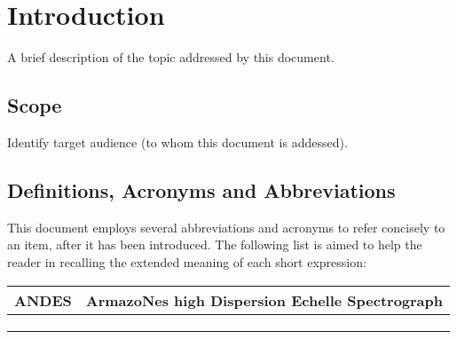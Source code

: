 \section{Introduction}
\label{sec:intro}

A brief description of the topic addressed by this document.


\subsection{Scope}
\label{sec:scope}

Identify target audience (to whom this document is addessed).


\subsection{Definitions, Acronyms and Abbreviations}
\label{sec:acronyms}

This document employs several abbreviations and acronyms to refer concisely to an item, after it has been introduced. The following list is aimed to help the reader in recalling the extended meaning of each short expression:

\begin{longtable}{ |l|l| }
  \hline
ANDES & ArmazoNes high Dispersion Echelle Spectrograph \\ \hline
      &                                                \\ \hline
      &                                                \\ \hline
      &                                                \\ \hline
\end{longtable}

\renewcommand\thetable{1} %
